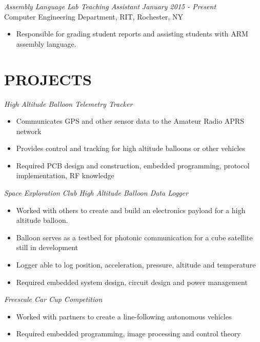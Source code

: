 \documentclass[line,margin]{res}
\begin{document}
\begin{resume}

	\vspace{-5pt}
		{\sl Assembly Language Lab Teaching Assistant } \hfill {\sl January 2015 - Present} \\
		Computer Engineering Department, RIT, Rochester, NY
		\begin{itemize}  \itemsep -2pt %
			\item Responsible for grading student reports and assisting students with ARM assembly language. 
		\end{itemize} 
\section{PROJECTS}
	{\sl High Altitude Balloon Telemetry Tracker }
		\begin{itemize} \itemsep -2pt
			\item Communicates GPS and other sensor data to the Amateur Radio APRS network
			\item Provides control and tracking for high altitude balloons or other vehicles
			\item Required PCB design and construction, embedded programming, protocol implementation, RF knowledge
		\end{itemize}

	\vspace{-10pt}
	{\sl Space Exploration Club High Altitude Balloon Data Logger}
		\begin{itemize} \itemsep -2pt
			\item Worked with others to create and build an electronics payload for a high altitude balloon.
			\item Balloon serves as a testbed for photonic communication for a cube satellite still in development 
			\item Logger able to log position, acceleration, pressure, altitude and temperature 
			\item Required embedded system design, circuit design and power management
		\end{itemize}
	\vspace{-10pt}
	{\sl Freescale Car Cup Competition}
		\begin{itemize} \itemsep -2pt
			\item Worked with partners to create a line-following autonomous vehicles
			\item Required embedded programming, image processing and control theory
		\end{itemize}


\end{resume}
\end{document}
